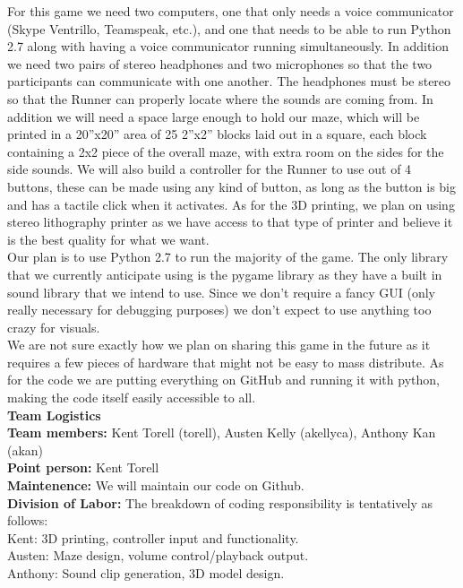 \documentclass[12pt]{article}
\begin{document}
\indent For this game we need two computers, one that only needs a voice communicator (Skype Ventrillo, Teamspeak, etc.), and one that needs to be able to run Python 2.7 along with having a voice communicator running simultaneously.  In addition we need two pairs of stereo headphones and two microphones so that the two participants can communicate with one another.  The headphones must be stereo so that the Runner can properly locate where the sounds are coming from.  In addition we will need a space large enough to hold our maze, which will be printed in a 20''x20'' area of 25 2''x2'' blocks laid out in a square, each block containing a 2x2 piece of the overall maze, with extra room on the sides for the side sounds.  We will also build a controller for the Runner to use out of 4 buttons, these can be made using any kind of button, as long as the button is big and has a tactile click when it activates.  As for the 3D printing, we plan on using stereo lithography printer as we have access to that type of printer and believe it is the best quality for what we want.\\
\indent Our plan is to use Python 2.7 to run the majority of the game.  The only library that we currently anticipate using is the pygame library as they have a built in sound library that we intend to use.  Since we don't require a fancy GUI (only really necessary for debugging purposes) we don't expect to use anything too crazy for visuals.\\
\indent We are not sure exactly how we plan on sharing this game in the future as it requires a few pieces of hardware that might not be easy to mass distribute.  As for the code we are putting everything on GitHub and running it with python, making the code itself easily accessible to all.\\

\textbf{\large Team Logistics}\\
\textbf{Team members:} Kent Torell (torell), Austen Kelly (akellyca), Anthony Kan (akan)\\
\textbf{Point person:} Kent Torell\\
\textbf{Maintenence:} We will maintain our code on Github. \\
\textbf{Division of Labor:} The breakdown of coding responsibility is tentatively as follows:\\
\indent Kent: 3D printing, controller input and functionality.\\
\indent Austen: Maze design, volume control/playback output.\\
\indent Anthony: Sound clip generation, 3D model design. 
\end{document}
